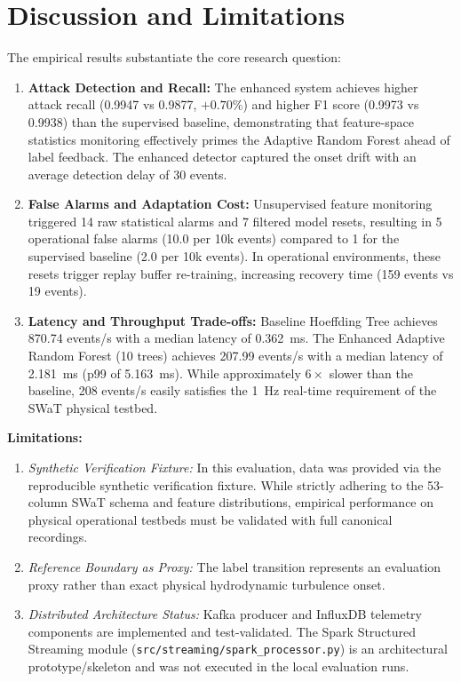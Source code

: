 \documentclass[conference]{IEEEtran}
\begin{document}
\section{Discussion and Limitations}
The empirical results substantiate the core research question:
\begin{enumerate}
    \item \textbf{Attack Detection and Recall:} The enhanced system achieves higher attack recall (0.9947 vs 0.9877, $+0.70\%$) and higher F1 score (0.9973 vs 0.9938) than the supervised baseline, demonstrating that feature-space statistics monitoring effectively primes the Adaptive Random Forest ahead of label feedback. The enhanced detector captured the onset drift with an average detection delay of 30 events.
    \item \textbf{False Alarms and Adaptation Cost:} Unsupervised feature monitoring triggered 14 raw statistical alarms and 7 filtered model resets, resulting in 5 operational false alarms (10.0 per 10k events) compared to 1 for the supervised baseline (2.0 per 10k events). In operational environments, these resets trigger replay buffer re-training, increasing recovery time (159 events vs 19 events).
    \item \textbf{Latency and Throughput Trade-offs:} Baseline Hoeffding Tree achieves 870.74 events/s with a median latency of 0.362~ms. The Enhanced Adaptive Random Forest (10 trees) achieves 207.99 events/s with a median latency of 2.181~ms (p99 of 5.163~ms). While approximately $6\times$ slower than the baseline, 208 events/s easily satisfies the 1~Hz real-time requirement of the SWaT physical testbed.
\end{enumerate}

\textbf{Limitations:}
\begin{enumerate}
    \item \emph{Synthetic Verification Fixture:} In this evaluation, data was provided via the reproducible synthetic verification fixture. While strictly adhering to the 53-column SWaT schema and feature distributions, empirical performance on physical operational testbeds must be validated with full canonical recordings.
    \item \emph{Reference Boundary as Proxy:} The label transition represents an evaluation proxy rather than exact physical hydrodynamic turbulence onset.
    \item \emph{Distributed Architecture Status:} Kafka producer and InfluxDB telemetry components are implemented and test-validated. The Spark Structured Streaming module (\texttt{src/streaming/spark\_processor.py}) is an architectural prototype/skeleton and was not executed in the local evaluation runs.
\end{enumerate}
\end{document}
